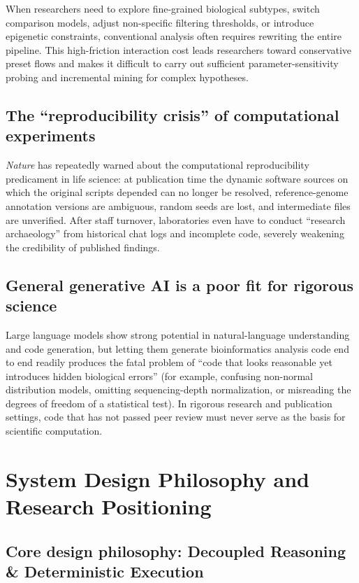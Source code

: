 \documentclass[11pt,a4paper]{article}
\begin{document}
When researchers need to explore fine-grained biological subtypes, switch comparison models, adjust non-specific filtering thresholds, or introduce epigenetic constraints, conventional analysis often requires rewriting the entire pipeline. This high-friction interaction cost leads researchers toward conservative preset flows and makes it difficult to carry out sufficient parameter-sensitivity probing and incremental mining for complex hypotheses.

\subsection{The ``reproducibility crisis'' of computational experiments}

\emph{Nature} has repeatedly warned about the computational reproducibility predicament in life science: at publication time the dynamic software sources on which the original scripts depended can no longer be resolved, reference-genome annotation versions are ambiguous, random seeds are lost, and intermediate files are unverified. After staff turnover, laboratories even have to conduct ``research archaeology'' from historical chat logs and incomplete code, severely weakening the credibility of published findings.

\subsection{General generative AI is a poor fit for rigorous science}

Large language models show strong potential in natural-language understanding and code generation, but letting them generate bioinformatics analysis code end to end readily produces the fatal problem of ``code that looks reasonable yet introduces hidden biological errors'' (for example, confusing non-normal distribution models, omitting sequencing-depth normalization, or misreading the degrees of freedom of a statistical test). In rigorous research and publication settings, code that has not passed peer review must never serve as the basis for scientific computation.

\section{System Design Philosophy and Research Positioning}

\subsection{Core design philosophy: Decoupled Reasoning \& Deterministic Execution}
\end{document}
